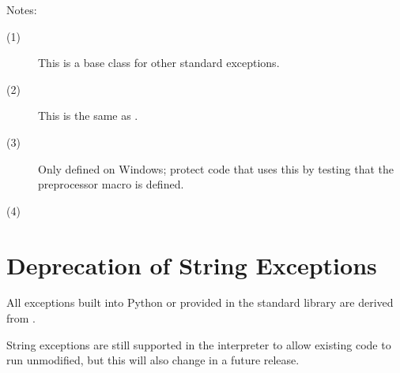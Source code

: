 \noindent
Notes:
\begin{description}
\item[(1)]
  This is a base class for other standard exceptions.

\item[(2)]
  This is the same as .

\item[(3)]
  Only defined on Windows; protect code that uses this by testing that
  the preprocessor macro  is defined.

\item[(4)]
\end{description}


\section{Deprecation of String Exceptions}

All exceptions built into Python or provided in the standard library
are derived from .

String exceptions are still supported in the interpreter to allow
existing code to run unmodified, but this will also change in a future
release.
